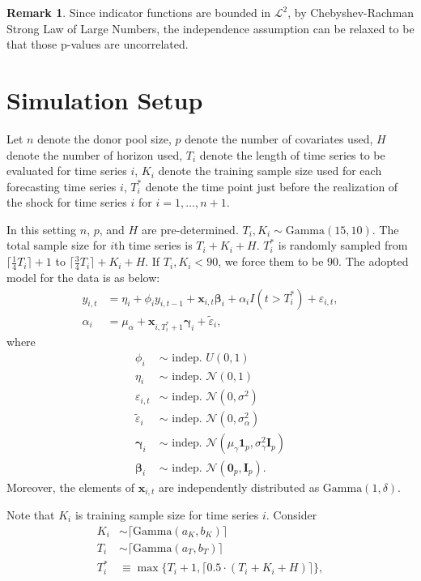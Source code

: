 \documentclass[11pt]{article}
\def\mbf#1{\mathbf{#1}} %
\def\mrm#1{\mathrm{#1}} %
\def\mc#1{\mathcal{#1}} %
\def\mc#1{\mathcal{#1}}
\def\bs#1{\boldsymbol{#1}}
\newcommand{\ceil}[1]{\lceil #1 \rceil}
\theoremstyle{definition}
\newtheorem{remark}{Remark}
\begin{document}
\begin{remark}
  Since indicator functions are bounded in $\mc{L}^2$, by Chebyshev-Rachman Strong Law of Large Numbers, the independence assumption can be relaxed to be that those p-values are uncorrelated.
\end{remark}

\section{Simulation Setup}
\label{simulation}

Let $n$ denote the donor pool size, $p$ denote the number of covariates used, $H$ denote the number of horizon used, $T_i$ denote the length of time series to be evaluated for time series $i$, $K_i$ denote the training sample size used for each  forecasting  time series $i$, $T_i^*$ denote the time point just before the realization of the shock for time series $i$ for $i = 1, \ldots, n+1$.


In this setting $n$, $p$, and $H$ are pre-determined. $T_i, K_i \sim \mrm{Gamma}(15, 10)$.  The total sample size for $i$th time series is $T_i + K_i + H$. $T_i^*$ is randomly sampled from $\ceil{\frac{1}{4}T_i}+1$ to $\ceil{\frac{3}{4} T_i} + K_i+ H$. If $T_i, K_i < 90$, we force them to be 90. The adopted model for the data is as below:
\begin{align*}
  y_{i,t} &= \eta_i + \phi_i y_{i,t-1} + \mbf{x}_{i,t} \bs{\beta}_i + \alpha_i I(t > T_i^*) + \varepsilon_{i,t},\\
  \alpha_i &= \mu_{\alpha} + \mbf{x}_{i,T_i^*+1}\bs{\gamma}_i + \tilde{\varepsilon}_{i},
\end{align*}
where
\begin{align*}
  \phi_i & \sim \text{ indep. }  U(0,1) \\
  \eta_i & \sim \text{ indep. }  \mc{N}(0,1) \\
  \varepsilon_{i,t} & \sim \text{ indep. } \mc{N}(0, \sigma^2)\\
  \tilde{\varepsilon}_i & \sim \text{ indep. } \mc{N}(0, \sigma_{\alpha}^2)
  \\
  \bs{\gamma}_i & \sim \text{ indep. } \mc{N}(\mu_{\gamma}\bs{1}_p, \sigma_{\gamma}^2 \mbf{I}_p) \\
  \bs{\beta}_i & \sim \text{ indep. }  \mc{N}(\bs{0}_p, \mbf{I}_p).
\end{align*}
Moreover, the elements of $\mathbf{x}_{i,t}$ are independently distributed as $\mrm{Gamma}(1,\delta)$.

Note that $K_i$ is training sample size for time series $i$. Consider
\begin{align*}
  K_i & \sim \ceil{\mrm{Gamma}(a_{K}, b_K)}\\
   T_i & \sim \ceil{\mrm{Gamma}(a_{T}, b_T)} \\
  T_i^* &\equiv \max\{T_i+1, \ceil{0.5 \cdot(T_i+K_i+H)}\},
\end{align*}
\end{document}
